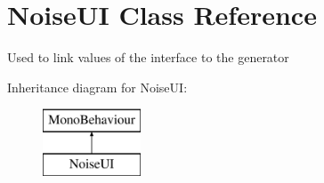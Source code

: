 \section{Noise\+UI Class Reference}
\label{class_noise_u_i}


Used to link values of the interface to the generator  


Inheritance diagram for Noise\+UI\+:\begin{figure}[H]
\begin{center}
\leavevmode
\includegraphics[height=2.000000cm]{class_noise_u_i}
\end{center}
\end{figure}
